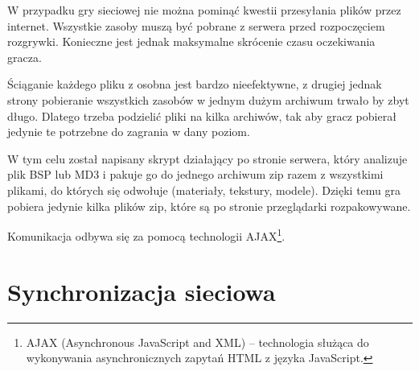 W przypadku gry sieciowej nie można pominąć kwestii przesyłania plików przez internet. Wszystkie
zasoby muszą być pobrane z serwera przed rozpoczęciem rozgrywki. Konieczne jest jednak maksymalne
skrócenie czasu oczekiwania gracza.

Ściąganie każdego pliku z osobna jest bardzo nieefektywne, z drugiej jednak strony pobieranie wszystkich
zasobów w jednym dużym archiwum trwało by zbyt długo. Dlatego trzeba podzielić pliki na kilka
archiwów, tak aby gracz pobierał jedynie te potrzebne do zagrania w dany poziom.

W tym celu został napisany skrypt działający po stronie serwera, który analizuje plik BSP lub MD3 i pakuje
go do jednego archiwum zip razem z wszystkimi plikami, do których się odwołuje (materiały, tekstury,
modele). Dzięki temu gra pobiera jedynie kilka plików zip, które są po stronie przeglądarki rozpakowywane.

Komunikacja odbywa się za pomocą technologii AJAX\footnote{AJAX (Asynchronous JavaScript and XML) -- technologia
służąca do wykonywania asynchronicznych zapytań HTML z języka JavaScript.}.

\section{Synchronizacja sieciowa}
\label{sec:synchronizacjaSieciowa}

